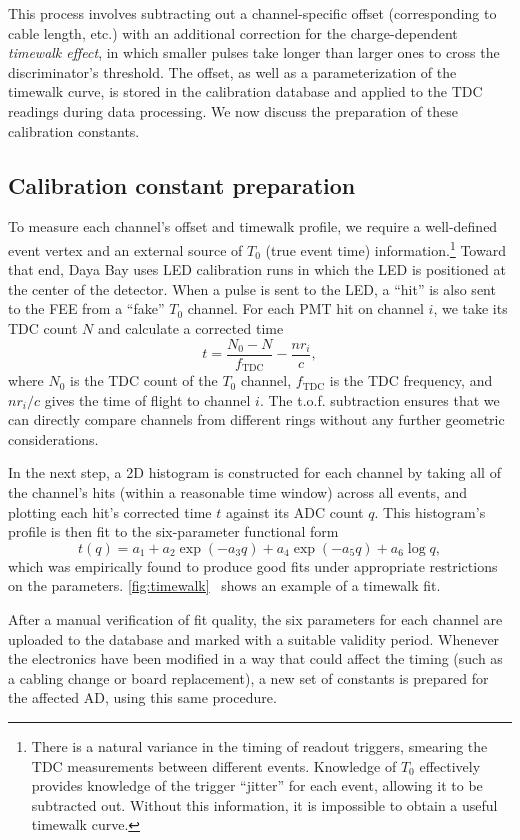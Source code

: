 \documentclass[../thesis.tex]{subfiles}
\begin{document}
This process involves subtracting out a channel-specific offset (corresponding to cable length, etc.) with an additional correction for the charge-dependent \emph{timewalk effect}, in which smaller pulses take longer than larger ones to cross the discriminator's threshold. The offset, as well as a parameterization of the timewalk curve, is stored in the calibration database and applied to the TDC readings during data processing. We now discuss the preparation of these calibration constants.

\subsection{Calibration constant preparation}

To measure each channel's offset and timewalk profile, we require a well-defined event vertex and an external source of $T_0$ (true event time) information.\footnote{There is a natural variance in the timing of readout triggers, smearing the TDC measurements between different events. Knowledge of $T_0$ effectively provides knowledge of the trigger ``jitter'' for each event, allowing it to be subtracted out. Without this information, it is impossible to obtain a useful timewalk curve.} Toward that end, Daya Bay uses LED calibration runs in which the LED is positioned at the center of the detector. When a pulse is sent to the LED, a ``hit'' is also sent to the FEE from a ``fake'' $T_0$ channel. For each PMT hit on channel $i$, we take its TDC count $N$ and calculate a corrected time
\[ t = \frac{N_0 - N}{f_\mathrm{TDC}} - \frac{n r_i}{c}, \] where $N_0$ is the TDC count of the $T_0$ channel, $f_\mathrm{TDC}$ is the TDC frequency, and $nr_i/c$ gives the time of flight to channel $i$. The t.o.f. subtraction ensures that we can directly compare channels from different rings without any further geometric considerations.

In the next step, a 2D histogram is constructed for each channel by taking all of the channel's hits (within a reasonable time window) across all events, and plotting each hit's corrected time $t$ against its ADC count $q$. This histogram's profile is then fit to the six-parameter functional form
\[ t(q) = a_1 + a_2 \exp (-a_3 q) + a_4 \exp (-a_5 q) + a_6 \log q, \] which was empirically found to produce good fits under appropriate restrictions on the parameters. \autoref{fig:timewalk}~ shows an example of a timewalk fit.

After a manual verification of fit quality, the six parameters for each channel are uploaded to the database and marked with a suitable validity period. Whenever the electronics have been modified in a way that could affect the timing (such as a cabling change or board replacement), a new set of constants is prepared for the affected AD, using this same procedure.
\end{document}
